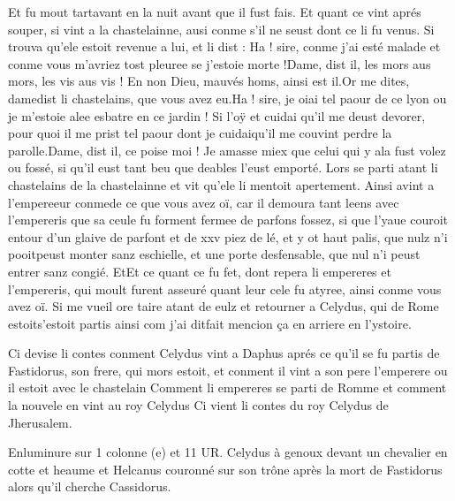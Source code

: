 \documentclass{article}
\begin{document}
\begin{pages}
   Et fu mout tartavant en la nuit avant que il fust fais. 
   Et quant ce vint aprés souper, si vint a la chastelainne, 
   ausi conme s’il ne seust dont ce li fu venus. Si trouva qu’ele estoit revenue a lui, et li dist :
   Ha ! sire, conme j’ai esté malade et conme vous m’avriez tost pleuree se j’estoie morte !Dame, dist il, les mors aus mors, les vis aus vis ! 
      En non Dieu, mauvés homs, ainsi est il.Or me dites, 
      damedist li chastelains, que vous avez eu.Ha ! sire, je oiai tel paour de ce 
      lyon ou je m’estoie alee esbatre en ce jardin ! Si l’oÿ et cuidai qu’il me deust 
      devorer, pour quoi il me prist tel paour dont je cuidaiqu'il me couvint 
      perdre la parolle.Dame, dist il, ce poise moi ! Je amasse miex que celui qui y ala fust volez ou fossé, 
   si qu’il eust tant beu que deables l’eust emporté.
   Lors se parti atant li chastelains de la chastelainne 
   et vit qu’ele li mentoit apertement. \pend
\pstart Ainsi avint a l’empereeur 
   conmede ce que vous avez oï,
   car il demoura tant leens avec l’empereris que sa ceule 
   fu forment fermee de parfons fossez, si que l’yaue couroit entour d’un glaive de parfont et de xxv piez de lé, 
   et y ot haut palis, que nulz n’i pooitpeust monter sanz eschielle, 
   et une porte desfensable, que nul n’i peust entrer sanz congié. 
   EtEt ce quant ce fu fet, dont repera 
   li empereres et l’empereris, 
   qui moult furent asseuré quant leur cele fu atyree, 
   ainsi conme vous avez oï. 
      Si me vueil ore taire atant de eulz 
      et retourner a Celydus, qui de Rome 
      estoits'estoit partis 
      ainsi com j’ai ditfait mencion 
      ça en arriere 
      en l’ystoire. \pend
         
         
            Ci devise li contes 
               conment Celydus
               vint a Daphus aprés ce qu’il se fu partis de 
               Fastidorus, son frere, qui mors estoit, 
               et conment il vint a son pere l’emperere 
               ou il estoit avec le chastelain
               Comment li empereres se parti de Romme et comment la nouvele en vint au roy Celydus
               Ci vient li contes du roy Celydus de Jherusalem.
            
               Enluminure sur 1 colonne (e) et 11 UR. 
                  Celydus à genoux devant un chevalier en cotte et 
                  heaume et Helcanus couronné sur son 
                  trône après la mort de Fastidorus alors 
                  qu’il cherche Cassidorus. 
               

\end{pages}
\end{document}
